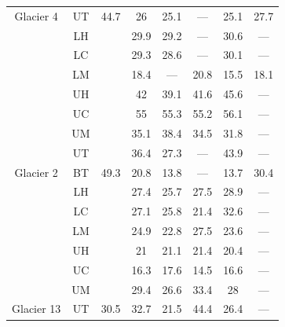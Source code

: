 \documentclass[12pt]{article}
\begin{document}
\begin{table}[]
\begin{tabular}{cccccccc}
\multirow{-7}{*}{ Glacier 4} & UT & \multirow{-7}{*}{ 44.7} & 26 & 25.1 & --- & 25.1 & 27.7 \\
 & LH &  & 29.9 & 29.2 & --- & 30.6 & --- \\
 & LC &  & 29.3 & 28.6 & --- & 30.1 & --- \\
 & LM &  & 18.4 & --- & 20.8 & 15.5 & 18.1 \\
 & UH &  & 42 & 39.1 & 41.6 & 45.6 & --- \\
 & UC &  & 55 & 55.3 & 55.2 & 56.1 & --- \\
 & UM &  & 35.1 & 38.4 & 34.5 & 31.8 & --- \\
 & UT &  & 36.4 & 27.3 & --- & 43.9 & --- \\
\multirow{-8}{*}{Glacier 2} & BT & \multirow{-8}{*}{49.3} & 20.8 & 13.8 & --- & 13.7 & 30.4 \\
  
  & LH &   & 27.4 & 25.7 & 27.5 & 28.9 & --- \\
  
  & LC &   & 27.1 & 25.8 & 21.4 & 32.6 & --- \\
  
  & LM &   & 24.9 & 22.8 & 27.5 & 23.6 & --- \\
  
  & UH &   & 21 & 21.1 & 21.4 & 20.4 & --- \\
  
  & UC &   & 16.3 & 17.6 & 14.5 & 16.6 & --- \\
  
  & UM &   & 29.4 & 26.6 & 33.4 & 28 & --- \\
  
\multirow{-7}{*}{ Glacier 13} & UT & \multirow{-7}{*}{ 30.5} & 32.7 & 21.5 & 44.4 & 26.4 & ---
\end{tabular}
\end{table}
\end{document}
